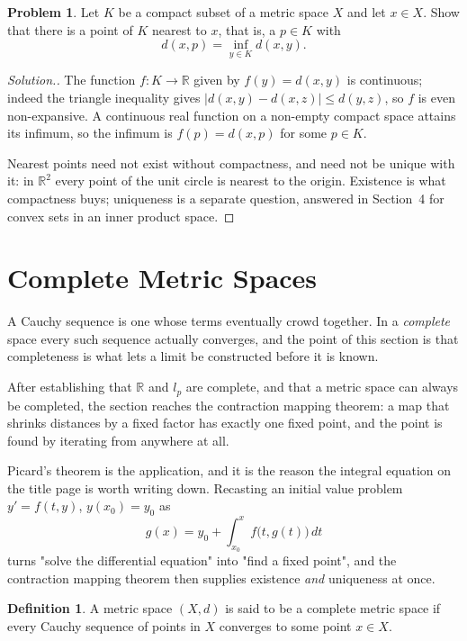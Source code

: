 \documentclass[11pt,a4paper]{article}
\theoremstyle{definition}
\newtheorem{defn}[thm]{Definition}
\newtheorem{problemx}{Problem}[section]
\newenvironment{problem}{\begin{problemx}}{\end{problemx}}
\newenvironment{solution}
  {\renewcommand{\qedsymbol}{}\begin{proof}[\textit{Solution}.]}
  {\end{proof}}
\begin{document}
\begin{problem}
Let $K$ be a compact subset of a metric space $X$ and let $x\in X$. Show that
there is a point of $K$ nearest to $x$, that is, a $p\in K$ with
$$d(x,p) = \inf_{y\in K}d(x,y).$$
\end{problem}
\begin{solution}
The function $f:K\rightarrow\mathbb{R}$ given by $f(y)=d(x,y)$ is continuous;
indeed the triangle inequality gives
$\big|d(x,y)-d(x,z)\big|\leq d(y,z)$, so $f$ is even non-expansive. A continuous
real function on a non-empty compact space attains its infimum, so the infimum
is $f(p)=d(x,p)$ for some $p\in K$.

Nearest points need not exist without compactness, and need not be unique with
it: in $\mathbb{R}^2$ every point of the unit circle is nearest to the origin.
Existence is what compactness buys; uniqueness is a separate question, answered
in Section~4 for convex sets in an inner product space.
\end{solution}



\section{Complete Metric Spaces}
A Cauchy sequence is one whose terms eventually crowd together. In a
\emph{complete} space every such sequence actually converges, and the point of
this section is that completeness is what lets a limit be constructed before it
is known.

After establishing that $\mathbb{R}$ and $l_p$ are complete, and that a
metric space can always be completed, the section reaches the contraction
mapping theorem: a map that shrinks distances by a fixed factor has exactly one
fixed point, and the point is found by iterating from anywhere at all.

Picard's theorem is the application, and it is the reason the integral equation
on the title page is worth writing down. Recasting an initial value problem
$y'=f(t,y)$, $y(x_0)=y_0$ as
$$g(x)=y_0+\int_{x_0}^{x}f\big(t,g(t)\big)\,dt$$
turns "solve the differential equation" into "find a fixed point", and the
contraction mapping theorem then supplies existence \emph{and} uniqueness at
once.


\begin{defn}
A metric space $(X,d)$ is said to be a complete metric space if every Cauchy sequence of points in $X$ converges to some point $x\in X$.

\end{defn}
\end{document}
